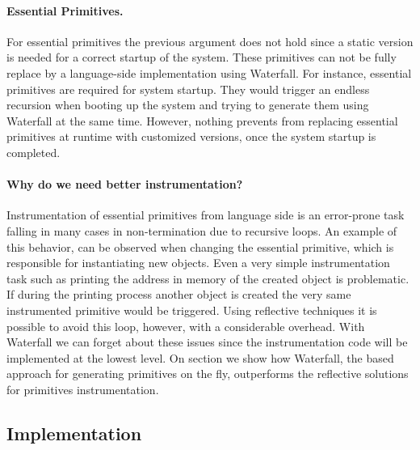 \paragraph{Essential Primitives.}
For essential primitives the previous argument does not hold since a static version is needed for a correct startup of the system.
These primitives can not be fully replace by a language-side implementation using Waterfall.
For instance, essential primitives are required for system startup.
They would trigger an endless recursion when booting up the system and trying to generate them using Waterfall at the same time.
However, nothing prevents from replacing essential primitives at runtime with customized versions, once the system startup is completed. 

\paragraph{Why do we need better instrumentation?}
Instrumentation of essential primitives from language side is an error-prone task falling in many cases in non-termination due to recursive loops. 
An example of this behavior, can be observed when changing the essential  primitive, which is responsible for instantiating new objects.
Even a very simple instrumentation task such as printing the address in memory of the created object is problematic.
If during the printing process another object is created the very same instrumented  primitive would be triggered.
Using reflective techniques it is possible to avoid this loop, however, with a considerable overhead.
With Waterfall we can forget about these issues since the instrumentation code will be implemented at the lowest level.
On section  we show how Waterfall, the \B based approach for generating primitives on the fly, outperforms the reflective solutions for primitives instrumentation. 


\subsection{Implementation}


